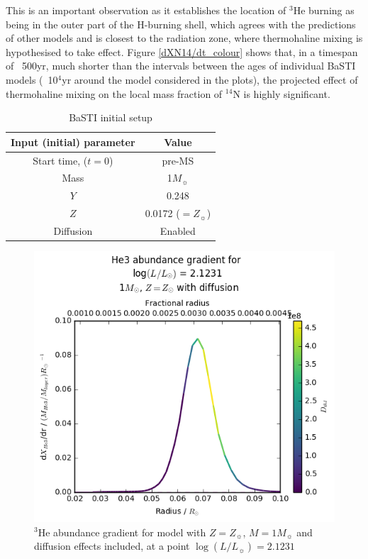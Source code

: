 \documentclass[usenatbib]{mnras}
\begin{document}
This is an important observation as it establishes the location of $^{3}$He burning as being in the outer part of the H-burning shell, which agrees with the predictions of other models and is closest to the radiation zone, where thermohaline mixing is hypothesised to take effect. Figure \ref{dXN14/dt_colour} shows that, in a timespan of ~500yr, much shorter than the intervals between the ages of individual BaSTI models (~10$^{4}$yr around the model considered in the plots), the projected effect of thermohaline mixing on the local mass fraction of $^{14}$N is highly significant.


\begin{table}
\begin{tabular}{cc}
\hline
Input (initial) parameter & Value \\
\hline
Start time, ($t=0$) & pre-MS \\
Mass & 1$M_{\sun}$ \\
$Y$ & 0.248 \\
$Z$ & 0.0172 ($=Z_{\sun}$) \\
Diffusion & Enabled \\
\hline
\end{tabular}
\caption{BaSTI initial setup}
\label{basti_params}
\end{table}

\begin{figure}
\begin{center}
\includegraphics[scale=0.6]{../mu_test_data/mu_test_graphs/eq_logL=2p1231_He3_radius_gradient_Dthl_color.png}
\caption{$^{3}$He abundance gradient for model with $Z = Z_{\sun}$, $M = 1M_{\sun}$ and diffusion effects included, at a point $\log(L/L_{\sun}) = 2.1231$}
\label{dHe3/dr_colour}
\end{center}
\end{figure}
\end{document}
